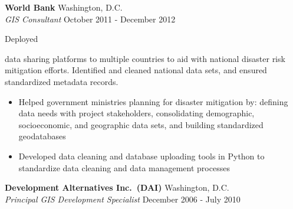 \documentclass[letterpaper]{article}
\newif\ifDATACV
\newif\ifGISCV
\begin{document}
\textbf{World Bank} 
    \hfill Washington, D.C.\\
    \ifDATACV
        \textit{Data Consultant} 
    \else \ifGISCV
        \textit{GIS Consultant} 
    \fi \fi
    \hfill October 2011 - December 2012\\
\vspace{1mm}

Deployed
    \ifGISCV
        spatial
    \fi
data sharing platforms to multiple countries to aid with national disaster risk
mitigation efforts. Identified and cleaned national data sets, and ensured
standardized metadata records.
\vspace{-1mm}
\begin{itemize} \itemsep 0pt
    \item Helped government ministries planning for disaster mitigation by:
    defining data needs with project stakeholders, consolidating demographic,
    socioeconomic, and geographic data sets, and building standardized
    geodatabases
    
    \item Developed data cleaning and database uploading tools in Python to 
    standardize data cleaning and data management processes
\end{itemize}


\textbf{Development Alternatives Inc.~(DAI)} 
    \hfill Washington, D.C.\\
    \ifDATACV
        \textit{Principal Development Specialist} 
    \else \ifGISCV
        \textit{Principal GIS Development Specialist} 
    \fi \fi
    \hfill December 2006 - July 2010\\
\vspace{1mm}
\end{document}

